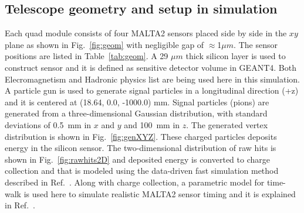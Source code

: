 \subsection{Telescope geometry and setup in simulation}\label{sec:geometry}
Each quad module consists of four MALTA2 sensors placed side by side in the $xy$ plane as shown in Fig.~\ref{fig:geom} with
negligible gap of $ \approx$1$\mu m$. 
The sensor positions are listed in Table~\ref{tab:geom}. A 29 $\mu m$ thick silicon layer is used to construct sensor and 
it is defined as sensitive detector volume in GEANT4. Both Elecromagnetism and Hadronic physics list are being used here in
this simulation. A particle gun is used to generate signal particles in a longitudinal direction (+z) and it is centered at (18.64, 0.0, -1000.0) mm. 
Signal particles (pions) are generated from a three-dimensional Gaussian distribution, with standard deviations of 0.5~mm in $x$ and $y$ and 100~mm in $z$. The generated vertex distribution is shown in Fig.~\ref{fig:genXYZ}. These charged particles deposits energy in the silicon sensor. The two-dimensional distribution of raw hits is shown in Fig.~\ref{fig:rawhits2D} and deposited energy is converted to charge collection and that is modeled using the data-driven fast simulation method described in Ref.~\cite{FastSim}. Along with charge collection, a parametric model for time-walk is used here to simulate realistic MALTA2  sensor timing and it is explained in Ref.~\cite{FastSim}. 

